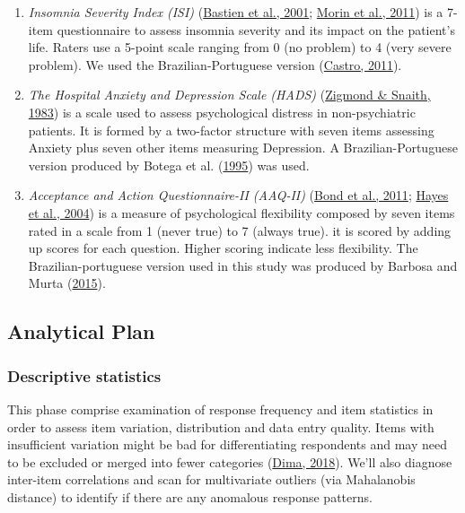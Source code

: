 \documentclass[
  ,doc,11pt, twoside,floatsintext]{apa6}
\begin{document}
\begin{enumerate}
\def\labelenumi{\arabic{enumi}.}
\item
  \emph{Insomnia Severity Index (ISI)} (\protect\hyperlink{ref-bastien2001}{Bastien et al., 2001}; \protect\hyperlink{ref-morin2011a}{Morin et al., 2011}) is a 7-item questionnaire to assess insomnia severity and its impact on the patient's life. Raters use a 5-point scale ranging from 0 (no problem) to 4 (very severe problem). We used the Brazilian-Portuguese version (\protect\hyperlink{ref-castro}{Castro, 2011}).
\item
  \emph{The Hospital Anxiety and Depression Scale (HADS)} (\protect\hyperlink{ref-zigmond1983hospital}{Zigmond \& Snaith, 1983}) is a scale used to assess psychological distress in non-psychiatric patients. It is formed by a two-factor structure with seven items assessing Anxiety plus seven other items measuring Depression. A Brazilian-Portuguese version produced by Botega et al. (\protect\hyperlink{ref-botega1995transtornos}{1995}) was used.
\item
  \emph{Acceptance and Action Questionnaire-II (AAQ-II)} (\protect\hyperlink{ref-bond2011preliminary}{Bond et al., 2011}; \protect\hyperlink{ref-hayes2004measuring}{Hayes et al., 2004}) is a measure of psychological flexibility composed by seven items rated in a scale from 1 (never true) to 7 (always true). it is scored by adding up scores for each question. Higher scoring indicate less flexibility. The Brazilian-portuguese version used in this study was produced by Barbosa and Murta (\protect\hyperlink{ref-barbosa2015propriedades}{2015}).
\end{enumerate}

\hypertarget{analytical-plan}{%
\subsection{Analytical Plan}\label{analytical-plan}}

\hypertarget{descriptive-statistics}{%
\subsubsection{Descriptive statistics}\label{descriptive-statistics}}

This phase comprise examination of response frequency and item statistics in order to assess item variation, distribution and data entry quality. Items with insufficient variation might be bad for differentiating respondents and may need to be excluded or merged into fewer categories (\protect\hyperlink{ref-dima2018}{Dima, 2018}). We'll also diagnose inter-item correlations and scan for multivariate outliers (via Mahalanobis distance) to identify if there are any anomalous response patterns.
\end{document}
